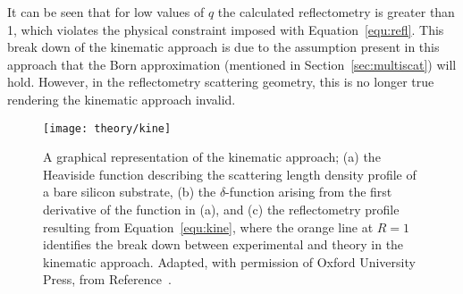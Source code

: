 It can be seen that for low values of $q$ the calculated reflectometry is greater than 1, which violates the physical constraint imposed with Equation~\ref{equ:refl}.
This break down of the kinematic approach is due to the assumption present in this approach that the Born approximation (mentioned in Section~\ref{sec:multiscat}) will hold.
However, in the reflectometry scattering geometry, this is no longer true rendering the kinematic approach invalid.
%
\begin{figure}
    \centering
    \texttt{[image: theory/kine]}
    \caption{A graphical representation of the kinematic approach; (a) the Heaviside function describing the scattering length density profile of a bare silicon substrate, (b) the $\delta$-function arising from the first derivative of the function in (a), and (c) the reflectometry profile resulting from Equation~\ref{equ:kine}, where the orange line at $R=1$ identifies the break down between experimental and theory in the kinematic approach. Adapted, with permission of Oxford University Press\textsuperscript{\textcopyright}, from Reference~\cite{sivia_elementary_2011}.}
    \label{fig:kine}
\end{figure}
%

